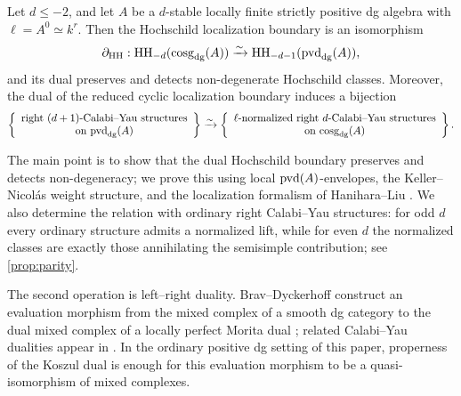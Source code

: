 \documentclass[11pt,a4paper,dvipsnames,x11names]{amsart}
\begin{document}
\begin{mainthm}\label{main:normalized-CY}
Let $d\leq-2$, and let $A$ be a $d$-stable locally finite strictly positive dg algebra with $\ell=A^0\simeq k^r$. Then the Hochschild localization boundary is an isomorphism
\[
\partial_{\mathrm{HH}}:
\operatorname{HH}_{-d}(\operatorname{cosg}_{\mathrm{dg}}(A))
\xrightarrow{\sim}
\operatorname{HH}_{-d-1}(\operatorname{pvd}_{\mathrm{dg}}(A)),
\]
and its dual preserves and detects non-degenerate Hochschild classes. Moreover, the dual of the reduced cyclic localization boundary induces a bijection
\[
\left\{\begin{array}{c}\text{right $(d+1)$-Calabi--Yau structures}\\ \text{on $\operatorname{pvd}_{\mathrm{dg}}(A)$}\end{array}\right\}
\xrightarrow{\sim}
\left\{\begin{array}{c}\text{$\ell$-normalized right $d$-Calabi--Yau structures}\\ \text{on $\operatorname{cosg}_{\mathrm{dg}}(A)$}\end{array}\right\}.
\]
\end{mainthm}

The main point is to show that the dual Hochschild boundary preserves and detects non-degeneracy; we prove this using local $\operatorname{pvd}(A)$-envelopes, the Keller--Nicol\'as weight structure, and the localization formalism of Hanihara--Liu \cite{KN13,HaniharaLiu26}. We also determine the relation with ordinary right Calabi--Yau structures: for odd $d$ every ordinary structure admits a normalized lift, while for even $d$ the normalized classes are exactly those annihilating the semisimple contribution; see \cref{prop:parity}.

The second operation is left--right duality. Brav--Dyckerhoff construct an evaluation morphism from the mixed complex of a smooth dg category to the dual mixed complex of a locally perfect Morita dual \cite{BravDyckerhoff19}; related Calabi--Yau dualities appear in \cite{KellerLiuAmiot24,HolsteinRivera24}. In the ordinary positive dg setting of this paper, properness of the Koszul dual is enough for this evaluation morphism to be a quasi-isomorphism of mixed complexes.
\end{document}
